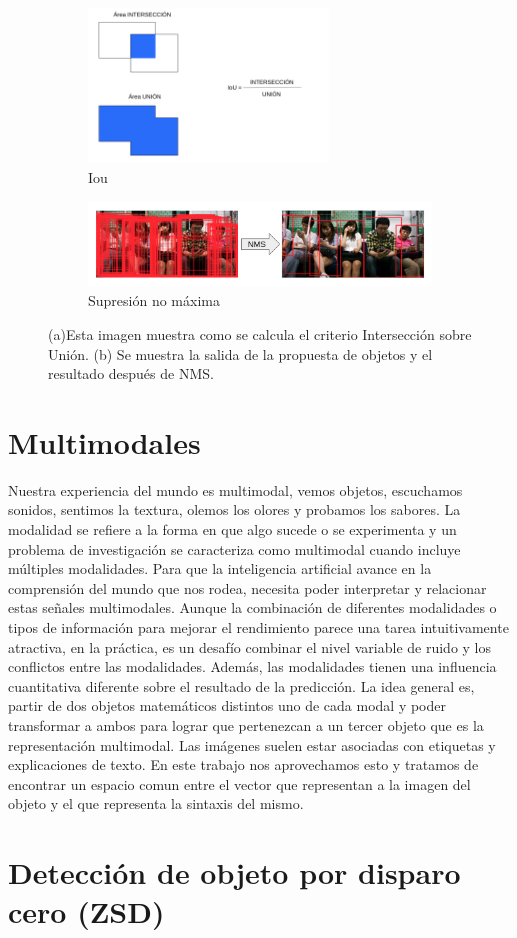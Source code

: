 \begin{figure}[H]
	\begin{subfigure}{.4\textwidth}
		\centering
		\includegraphics[width=0.7\textwidth]{img/iou.png}
		\caption{Iou}
		\label{fig:IoU}
	\end{subfigure}
	\begin{subfigure}{.6\textwidth}
		\centering
		\centering
		\includegraphics[width=1.1\textwidth]{img/NMS.png}
		\caption{Supresión no máxima}
		\label{fig:NMS}
	\end{subfigure}
	\caption{(a)Esta imagen muestra como se calcula el criterio Intersección sobre Unión. (b) Se muestra la salida de la propuesta de objetos y el resultado después de NMS.}
		\label{fig:RP}
\end{figure}

\section{Multimodales}

Nuestra experiencia del mundo es multimodal, vemos objetos, escuchamos sonidos, sentimos la textura, olemos los olores y probamos los sabores. La modalidad se refiere a la forma en que algo sucede o se experimenta y un problema de investigación se caracteriza como multimodal cuando incluye múltiples modalidades. Para que la inteligencia artificial avance en la comprensión del mundo que nos rodea, necesita poder interpretar y relacionar estas señales multimodales. Aunque la combinación de diferentes modalidades o tipos de información para mejorar el rendimiento parece una tarea intuitivamente atractiva, en la práctica, es un desafío combinar el nivel variable de ruido y los conflictos entre las modalidades. Además, las modalidades tienen una influencia cuantitativa diferente sobre el resultado de la predicción. La idea general es, partir de dos objetos matemáticos distintos uno de cada modal y poder transformar a ambos para lograr que pertenezcan a un tercer objeto que es la representación multimodal. Las imágenes suelen estar asociadas con etiquetas y explicaciones de texto. En este trabajo nos aprovechamos esto y tratamos de encontrar un espacio comun entre el vector que representan a la imagen del objeto y el que representa la sintaxis del mismo.
\section {Detección de objeto por disparo cero (ZSD)}
